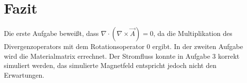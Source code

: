 \chapter{Fazit}\label{sec:fazit}
Die erste Aufgabe beweißt, dass $\nabla\cdot(\nabla\times\vec{A}) = 0$, da die Multiplikation des Divergenzoperators mit dem Rotationsoperator 0 ergibt. 
In der zweiten Aufgabe wird die Materialmatrix errechnet. Der Stromfluss konnte in Aufgabe 3 korrekt simuliert werden, das simulierte Magnetfeld entspricht jedoch nicht den Erwartungen. 